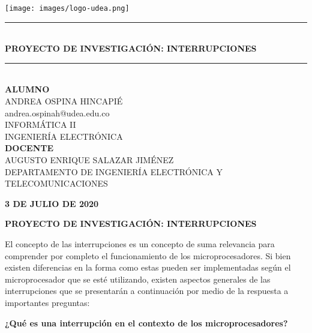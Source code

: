 \documentclass[a4paper,11pt]{article}
\newcommand{\HRule}{\rule{\linewidth}{0.5mm}}
\begin{document}
\begin{titlepage}
\begin{center}

\texttt{[image: images/logo-udea.png]}~
\\[2cm]



\HRule \\[0.4cm]
{\large \bfseries PROYECTO DE INVESTIGACIÓN: INTERRUPCIONES \\
[0.4cm]}
\HRule 
\\[2cm]

\large\textbf{ALUMNO}\\[1cm]
ANDREA OSPINA HINCAPIÉ\\
andrea.ospinah@udea.edu.co\\
INFORMÁTICA II \\
 INGENIERÍA ELECTRÓNICA
\\[1.5cm]

\large\textbf{DOCENTE}\\[1cm]
AUGUSTO ENRIQUE SALAZAR JIMÉNEZ\\
DEPARTAMENTO DE INGENIERÍA ELECTRÓNICA Y TELECOMUNICACIONES
\\[1cm]



\vfill

{\large \textbf{3 DE JULIO DE 2020}}

\end{center}
\end{titlepage}

\newpage
\centerline{{\large\bfseries PROYECTO DE INVESTIGACIÓN: INTERRUPCIONES}}
El concepto de las interrupciones es un concepto de suma relevancia para comprender por completo el funcionamiento de los microprocesadores. Si bien existen diferencias en la forma como estas pueden ser implementadas según el microprocesador que se esté utilizando, existen aspectos generales de las interrupciones que se presentarán a continuación por medio de la respuesta a importantes preguntas: 

{\large\bfseries ¿Qué es una interrupción en el contexto de los microprocesadores?} 
\end{document}
